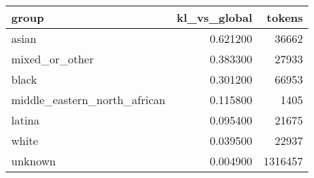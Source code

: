 \begin{tabular}{lrr}
\toprule
group & kl_vs_global & tokens \\
\midrule
asian & 0.621200 & 36662 \\
mixed_or_other & 0.383300 & 27933 \\
black & 0.301200 & 66953 \\
middle_eastern_north_african & 0.115800 & 1405 \\
latina & 0.095400 & 21675 \\
white & 0.039500 & 22937 \\
unknown & 0.004900 & 1316457 \\
\bottomrule
\end{tabular}
